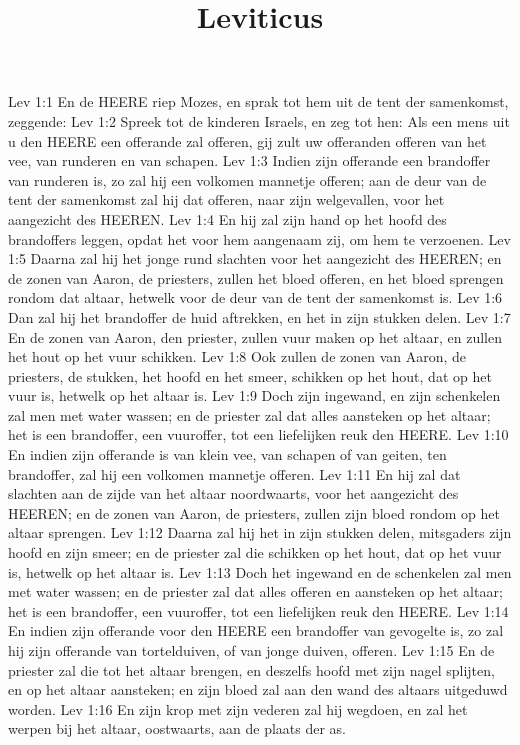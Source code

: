 

\title{Leviticus}


Lev 1:1  En de HEERE riep Mozes, en sprak tot hem uit de tent der samenkomst, zeggende:
Lev 1:2  Spreek tot de kinderen Israels, en zeg tot hen: Als een mens uit u den HEERE een offerande zal offeren, gij zult uw offeranden offeren van het vee, van runderen en van schapen.
Lev 1:3  Indien zijn offerande een brandoffer van runderen is, zo zal hij een volkomen mannetje offeren; aan de deur van de tent der samenkomst zal hij dat offeren, naar zijn welgevallen, voor het aangezicht des HEEREN.
Lev 1:4  En hij zal zijn hand op het hoofd des brandoffers leggen, opdat het voor hem aangenaam zij, om hem te verzoenen.
Lev 1:5  Daarna zal hij het jonge rund slachten voor het aangezicht des HEEREN; en de zonen van Aaron, de priesters, zullen het bloed offeren, en het bloed sprengen rondom dat altaar, hetwelk voor de deur van de tent der samenkomst is.
Lev 1:6  Dan zal hij het brandoffer de huid aftrekken, en het in zijn stukken delen.
Lev 1:7  En de zonen van Aaron, den priester, zullen vuur maken op het altaar, en zullen het hout op het vuur schikken.
Lev 1:8  Ook zullen de zonen van Aaron, de priesters, de stukken, het hoofd en het smeer, schikken op het hout, dat op het vuur is, hetwelk op het altaar is.
Lev 1:9  Doch zijn ingewand, en zijn schenkelen zal men met water wassen; en de priester zal dat alles aansteken op het altaar; het is een brandoffer, een vuuroffer, tot een liefelijken reuk den HEERE.
Lev 1:10  En indien zijn offerande is van klein vee, van schapen of van geiten, ten brandoffer, zal hij een volkomen mannetje offeren.
Lev 1:11  En hij zal dat slachten aan de zijde van het altaar noordwaarts, voor het aangezicht des HEEREN; en de zonen van Aaron, de priesters, zullen zijn bloed rondom op het altaar sprengen.
Lev 1:12  Daarna zal hij het in zijn stukken delen, mitsgaders zijn hoofd en zijn smeer; en de priester zal die schikken op het hout, dat op het vuur is, hetwelk op het altaar is.
Lev 1:13  Doch het ingewand en de schenkelen zal men met water wassen; en de priester zal dat alles offeren en aansteken op het altaar; het is een brandoffer, een vuuroffer, tot een liefelijken reuk den HEERE.
Lev 1:14  En indien zijn offerande voor den HEERE een brandoffer van gevogelte is, zo zal hij zijn offerande van tortelduiven, of van jonge duiven, offeren.
Lev 1:15  En de priester zal die tot het altaar brengen, en deszelfs hoofd met zijn nagel splijten, en op het altaar aansteken; en zijn bloed zal aan den wand des altaars uitgeduwd worden.
Lev 1:16  En zijn krop met zijn vederen zal hij wegdoen, en zal het werpen bij het altaar, oostwaarts, aan de plaats der as.
